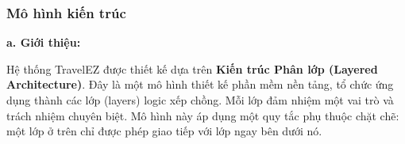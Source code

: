 
\subsubsection{Mô hình kiến trúc}

\noindent\textbf{a. Giới thiệu:}\par
Hệ thống TravelEZ được thiết kế dựa trên \textbf{Kiến trúc Phân lớp (Layered Architecture)}.
Đây là một mô hình thiết kế phần mềm nền tảng, tổ chức ứng dụng thành các lớp (layers) logic xếp chồng.
Mỗi lớp đảm nhiệm một vai trò và trách nhiệm chuyên biệt. Mô hình này áp dụng một quy tắc phụ thuộc chặt chẽ:
một lớp ở trên chỉ được phép giao tiếp với lớp ngay bên dưới nó.

